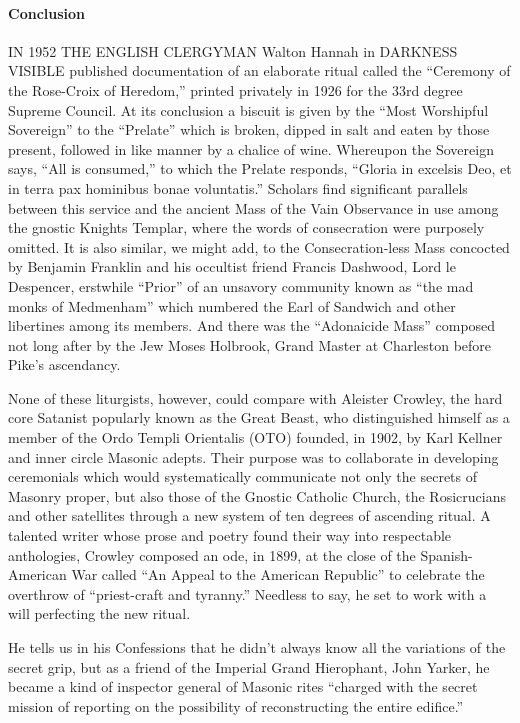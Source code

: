 \paragraph{Conclusion} IN 1952 THE ENGLISH CLERGYMAN Walton Hannah in DARKNESS VISIBLE published documentation of an elaborate ritual called the ``Ceremony of the Rose-Croix of Heredom,'' printed privately in 1926 for the 33rd degree Supreme Council. At its conclusion a biscuit is given by the ``Most Worshipful Sovereign'' to the ``Prelate'' which is broken, dipped in salt and eaten by those present, followed in like manner by a chalice of wine. Whereupon the Sovereign says, ``All is consumed,'' to which the Prelate responds, ``Gloria in excelsis Deo, et in terra pax hominibus bonae voluntatis.'' Scholars find significant parallels between this service and the ancient Mass of the Vain Observance in use among the gnostic Knights Templar, where the words of consecration were purposely omitted. It is also similar, we might add, to the Consecration-less Mass concocted by Benjamin Franklin and his occultist friend Francis Dashwood, Lord le Despencer, erstwhile ``Prior'' of an unsavory community known as ``the mad monks of Medmenham'' which numbered the Earl of Sandwich and other libertines among its members. And there was the ``Adonaicide Mass'' composed not long after by the Jew Moses Holbrook, Grand Master at Charleston before Pike's ascendancy.

None of these liturgists, however, could compare with Aleister Crowley, the hard core Satanist popularly known as the Great Beast, who distinguished himself as a member of the Ordo Templi Orientalis (OTO) founded, in 1902, by Karl Kellner and inner circle Masonic adepts. Their purpose was to collaborate in developing ceremonials which would systematically communicate not only the secrets of Masonry proper, but also those of the Gnostic Catholic Church, the Rosicrucians and other satellites through a new system of ten degrees of ascending ritual. A talented writer whose prose and poetry found their way into respectable anthologies, Crowley composed an ode, in 1899, at the close of the Spanish-American War called ``An Appeal to the American Republic'' to celebrate the overthrow of ``priest-craft and tyranny.'' Needless to say, he set to work with a will perfecting the new ritual.

He tells us in his Confessions that he didn't always know all the variations of the secret grip, but as a friend of the Imperial Grand Hierophant, John Yarker, he became a kind of inspector general of Masonic rites ``charged with the secret mission of reporting on the possibility of reconstructing the entire edifice.''

